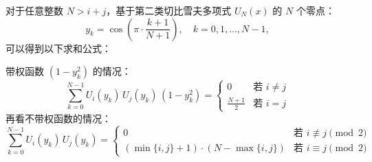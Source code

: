对于任意整数 $N > i + j$，基于第二类切比雪夫多项式 $U_N(x)$ 的 $N$ 个零点：
$$
y_k = \cos\left( \pi \cdot \frac{k + 1}{N + 1} \right),\quad k = 0, 1, \dots, N - 1,~
$$
可以得到以下求和公式：

带权函数 $(1 - y_k^2)$ 的情况：
$$
\sum_{k = 0}^{N - 1} U_i(y_k)\, U_j(y_k)\, (1 - y_k^2) =
\begin{cases}
0 & \text{若 } i \ne j \\
\frac{N + 1}{2} & \text{若 } i = j
\end{cases}~
$$
再看不带权函数的情况：
$$
\sum_{k = 0}^{N - 1} U_i(y_k)\, U_j(y_k) =
\begin{cases}
0 & \text{若 } i \not\equiv j \pmod{2} \\
(\min\{i, j\} + 1) \cdot (N - \max\{i, j\}) & \text{若 } i \equiv j \pmod{2}
\end{cases}~
$$

